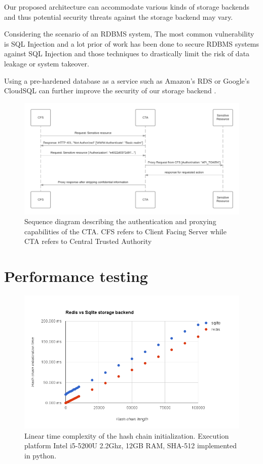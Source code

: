 \documentclass{sig-alternate-05-2015}
\begin{document}
Our proposed architecture can accommodate various kinds of storage backends and thus potential security threats against the storage backend may vary. 

Considering the scenario of an RDBMS system, The most common vulnerability is SQL Injection and a lot prior of work has been done to secure RDBMS systems against SQL Injection \cite{halfond_amnesia:_2005, boyd_sqlrand:_2004, halfond_classification_2006} and those techniques to drastically limit the risk of data leakage or system takeover.

Using a pre-hardened database as a service such as Amazon's RDS or Google's CloudSQL can further improve the security of our storage backend \cite{curino_relational_2011} .

\begin{figure}[!ht]
  \centering
  \includegraphics[keepaspectratio=true,scale=0.2]{sequence_diagram}
  \caption{Sequence diagram describing the authentication and proxying capabilities of the CTA. CFS refers to Client Facing Server while CTA refers to Central Trusted Authority}
  \label{fig:ctaarchitecture}
\end{figure}



\section{Performance testing}

\begin{figure}[h]
\includegraphics[scale=0.365]{performance}
\caption{Linear time complexity of the hash chain initialization. Execution platform Intel i5-5200U 2.2Ghz, 12GB RAM, SHA-512 implemented in python.}
\label{fig:performance}
\end{figure}
\end{document}
